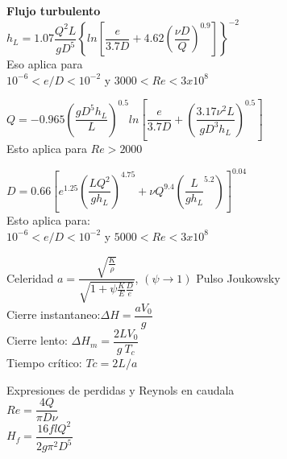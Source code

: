 \documentclass[11pt,a4paper]{article}
\begin{document}
\begin{multicols}{2}
\begin{cajita}
	\textbf{Flujo turbulento}\\
	$h_L=1.07\dfrac{Q^2L}{gD^5}\left\{ln\left[ \dfrac{e}{3.7D}+4.62 \left(\dfrac{\nu D}{Q}\right)^{0.9} \right]\right\}^{-2}$\\
	Eso aplica para\\ $10^{-6}<e/D<10^{-2}$ y $3000<Re<3x10^8$\\ \vspace*{0.25cm}
	
	$Q=-0.965\left(\dfrac{gD^5h_L}{L}\right)^{0.5}ln\left[\dfrac{e}{3.7D}+\left(\dfrac{3.17\nu^2L}{gD^3h_L}\right)^{0.5}\right]$\\
	Esto aplica para $Re>2000$\\ \vspace*{0.25cm}
	
	$D=0.66\left[e^{1.25}\left(\dfrac{LQ^2}{gh_L}\right)^{4.75}+\nu Q^{9.4}\left(\dfrac{L}{gh_L}^{5.2}\right)\right]^{0.04}$\\
	Esto aplica para:\\$10^{-6}<e/D<10^{-2}$ y $5000<Re<3x10^8$\\ \vspace*{0.25cm}
		\end{cajita}
		
		
		\begin{cajita}
			\vspace{.1cm}
			Celeridad $a=\dfrac{\sqrt{\frac{K}{\rho}}}{\sqrt{1+\psi \frac{K}{E} \frac{D}{e}}}$, $(\psi\rightarrow1)$
			Pulso Joukowsky\\ \vspace{.1cm}
			Cierre instantaneo:$\Delta H=\dfrac{a V_0}{g}$\\\vspace{.1cm}
			Cierre lento: $\Delta H_m=\dfrac{2 L V_0}{g~T_c}$\\\vspace{.1cm}
			Tiempo crítico: $Tc=2L/a$\\
		\end{cajita}

	\begin{cajita}
		Expresiones de perdidas y Reynols en caudala\\
		$Re=\dfrac{4Q}{\pi D \nu}$\\
		$H_f=\dfrac{16 f l Q^{2}}{2 g \pi^{2} D^{5}}$
		
	\end{cajita}
		
	\end{multicols}	
			
			
\end{document}
